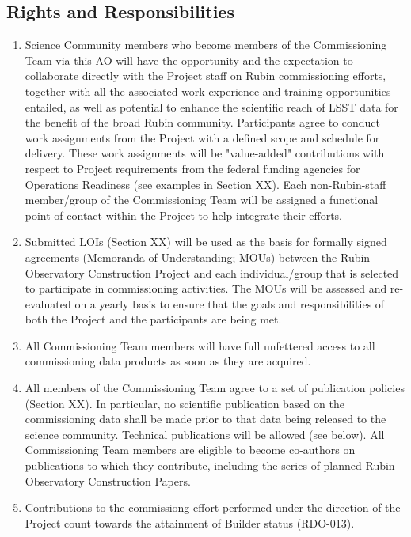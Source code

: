 \documentclass[SE,authoryear,toc]{lsstdoc}
\begin{document}
\subsection{Rights and Responsibilities}

\begin{enumerate}

\item Science Community members who become members of the Commissioning Team via this AO will have the opportunity and the expectation to collaborate directly with the Project staff on Rubin commissioning efforts, together with all the associated work experience and training opportunities entailed, as well as potential to enhance the scientific reach of LSST data for the benefit of the broad Rubin community. Participants agree to conduct work assignments from the Project with a defined scope and schedule for delivery. These work assignments will be "value-added" contributions with respect to Project requirements from the federal funding agencies for Operations Readiness (see examples in Section XX). Each non-Rubin-staff member/group of the Commissioning Team will be assigned a functional point of contact within the Project to help integrate their efforts.

\item Submitted LOIs (Section XX) will be used as the basis for formally signed agreements (Memoranda of Understanding; MOUs) between the Rubin Observatory Construction Project and each individual/group that is selected to participate in commissioning activities. The MOUs will be assessed and re-evaluated on a yearly basis to ensure that the goals and responsibilities of both the Project and the participants are being met. 

\item All Commissioning Team members will have full unfettered access to all commissioning data products as soon as they are acquired. 

\item All members of the Commissioning Team agree to a set of publication policies (Section XX). In particular, no scientific publication based on the commissioning data shall be made prior to that data being released to the science community.  Technical publications will be allowed (see below). All Commissioning Team members are eligible to become co-authors on publications to which they contribute, including the series of planned Rubin Observatory Construction Papers.

\item Contributions to the commissiong effort performed under the direction of the Project count towards the attainment of Builder status (RDO-013).


\end{enumerate}
\end{document}

